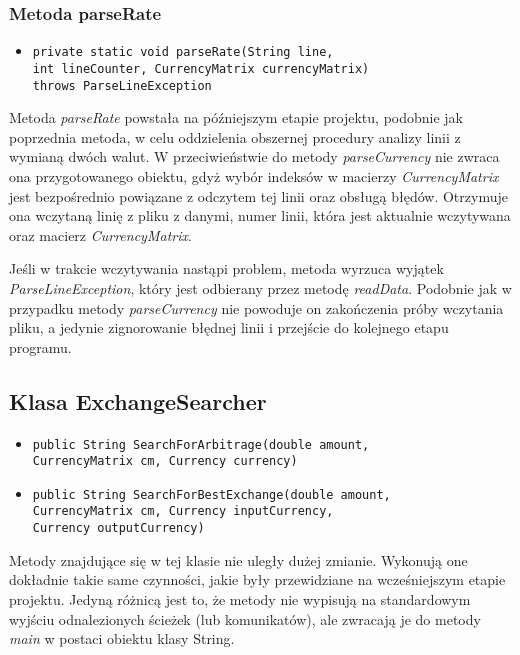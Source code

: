 \documentclass[a4paper,12pt]{article}
\newcommand\tab[1][0.6cm]{\hspace*{#1}}
\begin{document}
\subsubsection{Metoda parseRate}

\begin{itemize}
\item \begin{lstlisting}
private static void parseRate(String line,
int lineCounter, CurrencyMatrix currencyMatrix)
throws ParseLineException
\end{lstlisting}
\end{itemize}

\tab Metoda \textit{parseRate} powstała na późniejszym etapie projektu, podobnie jak poprzednia metoda, w celu oddzielenia obszernej procedury analizy linii z wymianą dwóch walut. W przeciwieństwie do metody \textit{parseCurrency} nie zwraca ona przygotowanego obiektu, gdyż wybór indeksów w macierzy  \textit{CurrencyMatrix} jest bezpośrednio powiązane z odczytem tej linii oraz obsługą błędów. Otrzymuje ona wczytaną linię z pliku z danymi, numer linii, która jest aktualnie wczytywana oraz macierz \textit{CurrencyMatrix}.

Jeśli w trakcie wczytywania nastąpi problem, metoda wyrzuca wyjątek \textit{ParseLineException}, który jest odbierany przez metodę \textit{readData}. Podobnie jak w przypadku metody \textit{parseCurrency} nie powoduje on zakończenia próby wczytania pliku, a jedynie zignorowanie błędnej linii i przejście do kolejnego etapu programu.

\subsection{Klasa ExchangeSearcher}

\begin{itemize}
\item \begin{lstlisting}
public String SearchForArbitrage(double amount,
CurrencyMatrix cm, Currency currency)
\end{lstlisting}

\item \begin{lstlisting}
public String SearchForBestExchange(double amount,
CurrencyMatrix cm, Currency inputCurrency,
Currency outputCurrency)
\end{lstlisting}
\end{itemize}

\tab Metody znajdujące się w tej klasie nie uległy dużej zmianie. Wykonują one dokładnie takie same czynności, jakie były przewidziane na wcześniejszym etapie projektu. Jedyną różnicą jest to, że metody nie wypisują na standardowym wyjściu odnalezionych ścieżek (lub komunikatów), ale zwracają je do metody \textit{main} w postaci obiektu klasy String.
\end{document}
